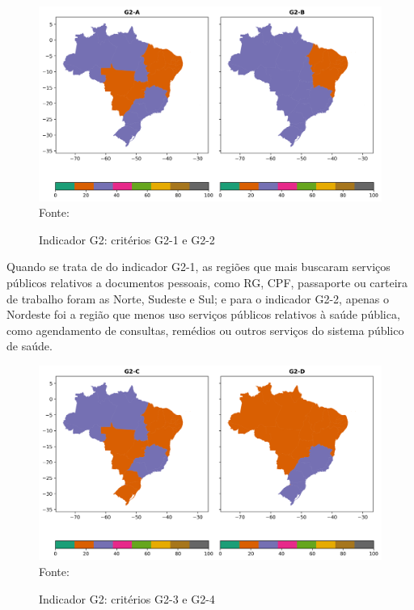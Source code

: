 \begin{figure}[H]
	\centering
	\caption{Indicador G2: critérios G2-1 e G2-2}
	\includegraphics[width=1\linewidth]{figuras/mapa_coropleto_tic_domicilio_g2_A_B.png}
	\label{fig:mapa_coropleto_tic_domicilio_g2_A_B}
	\footnotesize{Fonte: \cite{tic_domicilios_2024_g2}}
\end{figure}

Quando se trata de do indicador G2-1, as regiões que mais buscaram serviços públicos relativos a documentos pessoais, como RG, CPF, passaporte ou carteira de trabalho foram as Norte, Sudeste e Sul; e para o indicador G2-2, apenas o Nordeste foi a região que menos uso serviços públicos relativos à saúde pública, como agendamento de consultas, remédios ou outros serviços do sistema público de saúde.

\begin{figure}[H]
	\centering
	\caption{Indicador G2: critérios G2-3 e G2-4}
	\includegraphics[width=1\linewidth]{figuras/mapa_coropleto_tic_domicilio_g2_C_D.png}
	\label{fig:mapa_coropleto_tic_domicilio_g2_C_D}
	\footnotesize{Fonte: \cite{tic_domicilios_2024_g2}}
\end{figure}

